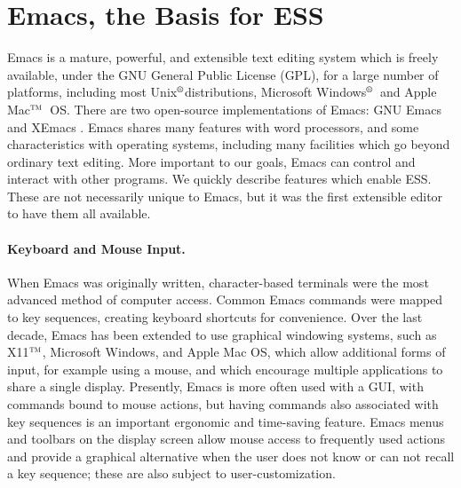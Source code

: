 \documentclass{article}
\newcommand*{\regstrd}{$^{\mbox{\scriptsize{\textregistered}}}$}
\newcommand*{\tm}{$^{\mbox{\scriptsize\sc tm}}$}
\begin{document}
\section{Emacs, the Basis for ESS}
\label{sec:emacs}

Emacs is a mature, powerful, and extensible text editing system which
is freely available, under the GNU General Public License (GPL), for a
large number of platforms, including most Unix\regstrd distributions,
Microsoft Windows\regstrd\ and Apple Mac\tm\ OS.  There are two
open-source implementations of Emacs: GNU Emacs \citep{GNU-Emacs} and
XEmacs \citep{XEmacs}.  Emacs shares many features with word
processors, and some characteristics with operating systems, including
many facilities which go beyond ordinary text editing.  More important
to our goals, Emacs can control and interact with other programs.  We
quickly describe features which enable ESS.  These are not necessarily
unique to Emacs, but it was the first extensible editor to have them
all available.

\paragraph{Keyboard and Mouse Input.}
When Emacs was originally written, character-based terminals were the
most advanced method of computer access.  Common Emacs commands were
mapped to key sequences, creating keyboard shortcuts for convenience.
Over the last decade, Emacs has been extended to use graphical
windowing systems, such as X11\tm, Microsoft Windows, and Apple Mac
OS, which allow additional forms of input, for example using a mouse,
and which encourage multiple applications to share a single display.
Presently, Emacs is more often used with a GUI, with commands bound to
mouse actions, but having commands also associated with key sequences
is an important ergonomic and time-saving feature.  Emacs menus and
toolbars on the display screen allow mouse access to frequently used
actions and provide a graphical alternative when the user does not
know or can not recall a key sequence; these are also subject to
user-customization.
\end{document}
